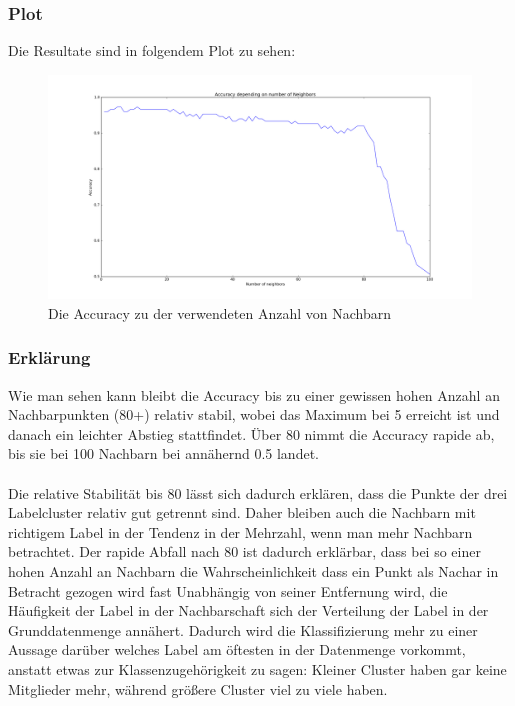 \documentclass{article}
\begin{document}
\subsubsection{Plot}
Die Resultate sind in folgendem Plot zu sehen:
\begin{figure}[h]
    \centering
    \includegraphics[width=\textwidth]{euclidean.png}
    \caption{Die Accuracy zu der verwendeten Anzahl von Nachbarn}
    \label{fig:euc}
\end{figure}
\FloatBarrier
\subsubsection{Erklärung}
Wie man sehen kann bleibt die Accuracy bis zu einer gewissen hohen Anzahl an Nachbarpunkten (80+) relativ stabil, wobei das Maximum bei 5 erreicht ist und danach ein leichter Abstieg stattfindet. Über 80 nimmt die Accuracy rapide ab, bis sie bei 100 Nachbarn bei annähernd 0.5 landet.
\paragraph{}
Die relative Stabilität bis 80 lässt sich dadurch erklären, dass die Punkte der drei Labelcluster relativ gut getrennt sind. Daher bleiben auch die Nachbarn mit richtigem Label in der Tendenz in der Mehrzahl, wenn man mehr Nachbarn betrachtet. Der rapide Abfall nach 80 ist dadurch erklärbar, dass bei so einer hohen Anzahl an Nachbarn die Wahrscheinlichkeit dass ein Punkt als Nachar in Betracht gezogen wird fast Unabhängig von seiner Entfernung wird, die Häufigkeit der Label in der Nachbarschaft sich der Verteilung der Label in der Grunddatenmenge annähert. Dadurch wird die Klassifizierung mehr zu einer Aussage darüber welches Label am öftesten in der Datenmenge vorkommt, anstatt etwas zur Klassenzugehörigkeit zu sagen: Kleiner Cluster haben gar keine Mitglieder mehr, während größere Cluster viel zu viele haben.
\end{document}
